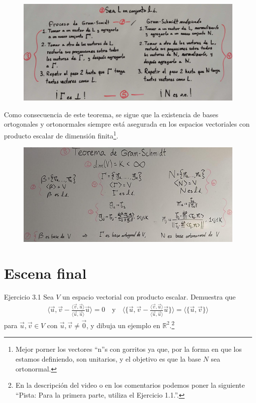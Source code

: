 \documentclass[12pt,dvipsnames]{article}
\numberwithin{equation}{section}
\begin{document}
\begin{figure}[h!]
    \centering
    \includegraphics[width=16cm]{3-1.png}
\end{figure}

Como consecuencia de este teorema, se sigue que la existencia de bases ortogonales y ortonormales siempre está asegurada en los espacios vectoriales con producto escalar de dimensión finita\footnote{Mejor porner los vectores ``n''s con gorritos ya que, por la forma en que los estamos definiendo, son unitarios, y el objetivo es que la base $N$ sea ortonormal.}.

\begin{figure}[h!]
    \centering
    \includegraphics[width=16cm]{3-2.png}
\end{figure}



\newpage
\section{Escena final}

Ejercicio 3.1 Sea $V$ un espacio vectorial con producto escalar. Demuestra que
\begin{align*}
    \bigg\langle \vec{u}, \vec{v} - \frac{\langle \vec{v}, \vec{u}\rangle}{\langle \vec{u} , \vec{u} \rangle}\vec{u} \bigg\rangle = 0 \quad \text{y} \quad \bigg\langle \bigg\{\vec{u}, \vec{v} - \frac{\langle \vec{v}, \vec{u}\rangle}{\langle \vec{u} , \vec{u} \rangle}\vec{u} \bigg\} \bigg\rangle = \langle \{\vec{u}, \vec{v}\} \rangle
\end{align*} para $\vec{u},\vec{v}\in V$ con $\vec{u},\vec{v}\neq\vec{0}$, y dibuja un ejemplo en $\mathbb{R}^2$.\footnote{En la descripción del video o en los comentarios podemos poner la siguiente ``Pista: Para la primera parte, utiliza el Ejercicio 1.1.''.}
\end{document}
